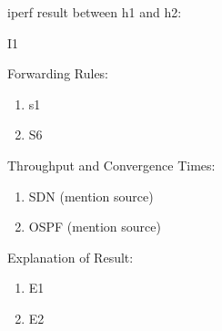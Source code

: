 \documentclass[12pt]{article}
\begin{document}
iperf result between h1 and h2:

I1

Forwarding Rules:
\begin{enumerate}
    \item s1
    \item S6
\end{enumerate}

Throughput and Convergence Times:
\begin{enumerate}
    \item SDN (mention source)
    \item OSPF (mention source)
\end{enumerate}

Explanation of Result:
\begin{enumerate}
    \item E1 
    \item E2
\end{enumerate}

\end{document}

